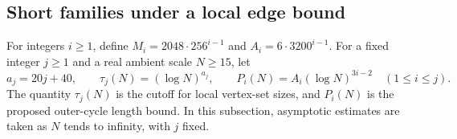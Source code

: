 \documentclass[10pt,letterpaper]{article}
\theoremstyle{definition}
\theoremstyle{remark}
\begin{document}
\subsection{Short families under a local edge bound}

For integers $i\ge1$, define $M_i=2048\cdot256^{i-1}$ and $A_i=6\cdot3200^{i-1}$. For a fixed integer $j\ge1$ and a real ambient scale $N\ge15$, let
\begin{equation}\label{eq:localfunctions}
a_j=20j+40,\qquad
\tau_j(N)=(\log N)^{a_j},\qquad
P_i(N)=A_i(\log N)^{3i-2}\quad(1\le i\le j).
\end{equation}
The quantity $\tau_j(N)$ is the cutoff for local vertex-set sizes, and $P_i(N)$ is the proposed outer-cycle length bound. In this subsection, asymptotic estimates are taken as $N$ tends to infinity, with $j$ fixed.
\end{document}

